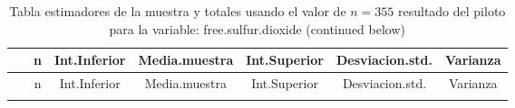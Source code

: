 \documentclass[
]{article}
\begin{document}
\begin{longtable}[]{@{}ccccccc@{}}
\caption{Tabla estimadores de la muestra y totales usando el valor de
\(n = 355\) resultado del piloto para la variable: free.sulfur.dioxide
(continued below)}\tabularnewline
\toprule
\begin{minipage}[b]{0.20\columnwidth}\centering
~\strut
\end{minipage} & \begin{minipage}[b]{0.04\columnwidth}\centering
n\strut
\end{minipage} & \begin{minipage}[b]{0.11\columnwidth}\centering
Int.Inferior\strut
\end{minipage} & \begin{minipage}[b]{0.12\columnwidth}\centering
Media.muestra\strut
\end{minipage} & \begin{minipage}[b]{0.11\columnwidth}\centering
Int.Superior\strut
\end{minipage} & \begin{minipage}[b]{0.13\columnwidth}\centering
Desviacion.std.\strut
\end{minipage} & \begin{minipage}[b]{0.09\columnwidth}\centering
Varianza\strut
\end{minipage}\tabularnewline
\midrule
\endfirsthead
\toprule
\begin{minipage}[b]{0.20\columnwidth}\centering
~\strut
\end{minipage} & \begin{minipage}[b]{0.04\columnwidth}\centering
n\strut
\end{minipage} & \begin{minipage}[b]{0.11\columnwidth}\centering
Int.Inferior\strut
\end{minipage} & \begin{minipage}[b]{0.12\columnwidth}\centering
Media.muestra\strut
\end{minipage} & \begin{minipage}[b]{0.11\columnwidth}\centering
Int.Superior\strut
\end{minipage} & \begin{minipage}[b]{0.13\columnwidth}\centering
Desviacion.std.\strut
\end{minipage} & \begin{minipage}[b]{0.09\columnwidth}\centering
Varianza\strut
\end{minipage}\tabularnewline
\midrule
\endhead
\begin{minipage}[t]{0.20\columnwidth}\centering

\end{minipage}
\end{longtable}
\end{document}
